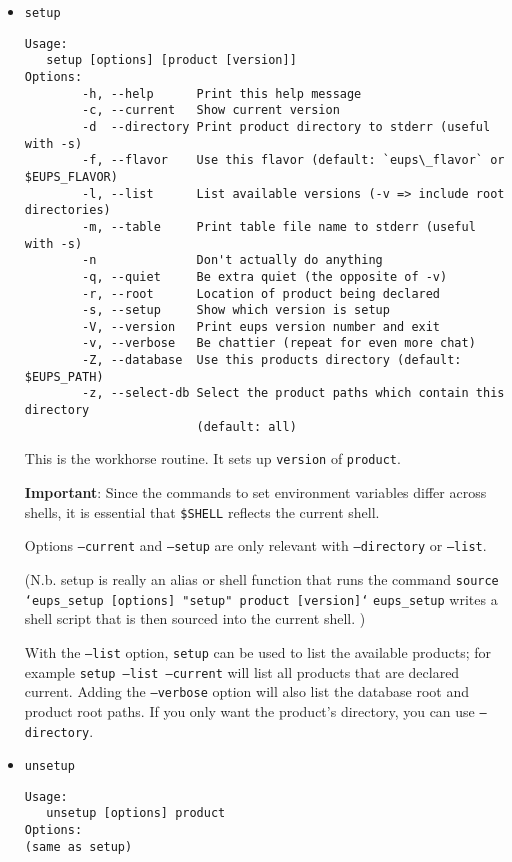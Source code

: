 \documentclass{article}
\newcommand{\code}[1]{\texttt{#1}}
\begin{document}
\begin{itemize}
\item \code{setup}
\begin{verbatim}
Usage:
   setup [options] [product [version]]
Options:
        -h, --help      Print this help message
        -c, --current   Show current version
        -d  --directory Print product directory to stderr (useful with -s)
        -f, --flavor    Use this flavor (default: `eups\_flavor` or $EUPS_FLAVOR)
        -l, --list      List available versions (-v => include root directories)
        -m, --table     Print table file name to stderr (useful with -s)
        -n              Don't actually do anything
        -q, --quiet     Be extra quiet (the opposite of -v)
        -r, --root      Location of product being declared
        -s, --setup     Show which version is setup
        -V, --version   Print eups version number and exit
        -v, --verbose   Be chattier (repeat for even more chat)
        -Z, --database  Use this products directory (default: $EUPS_PATH)
        -z, --select-db Select the product paths which contain this directory 
                        (default: all)
\end{verbatim}

This is the workhorse routine. It sets up \code{version} of \code{product}.

\textbf{Important}: Since the commands to set environment variables differ across shells,
it is essential that \code{\$SHELL} reflects the current shell.

Options \code{--current} and \code{--setup} are only relevant with \code{--directory}
or \code{--list}.

(N.b. setup is really an alias or shell function that runs the command\hfil\break
\code{source `eups\_setup [options] "setup" product [version]`}\hfil\break
\code{eups\_setup} writes a shell script that is then sourced into the
current shell.
)

With the \code{--list} option, \code{setup} can be used to list the available
products; for example \code{setup --list --current} will list all products that
are declared current. Adding the \code{--verbose} option will also
list the database root and product root paths.  If you only want the product's
directory, you can use \code{--directory}.


\item \code{unsetup}
\begin{verbatim}
Usage:
   unsetup [options] product
Options:
(same as setup)
\end{verbatim}
  

\end{itemize}
\end{document}
